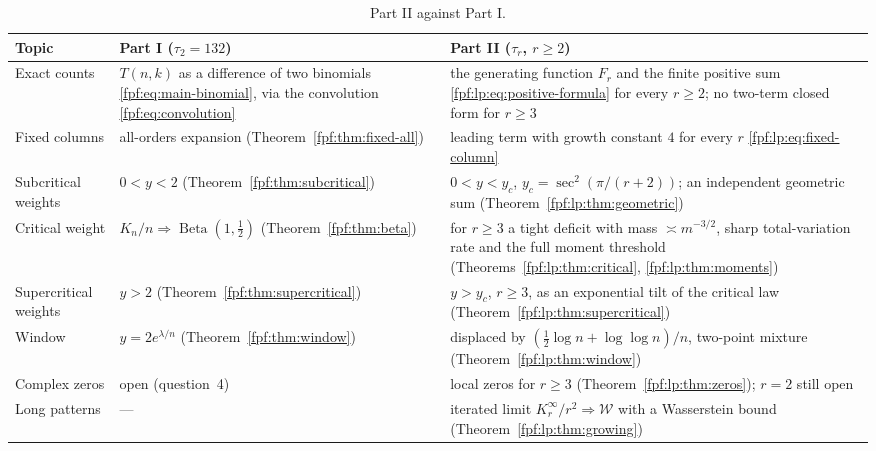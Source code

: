 \documentclass[11pt]{article}
\numberwithin{equation}{section}
\theoremstyle{definition}
\newcommand{\Beta}{\operatorname{Beta}}
\begin{document}
\begin{table}[htbp]
\centering\small
\renewcommand{\arraystretch}{1.15}
\begin{tabular}{@{}>{\raggedright\arraybackslash}p{}>{\raggedright\arraybackslash}p{}>{\raggedright\arraybackslash}p{}@{}}
\toprule
Topic & Part I ($\tau_2=132$) & Part II ($\tau_r$, $r\ge2$)\\
\midrule
Exact counts &
$T(n,k)$ as a difference of two binomials
\eqref{fpf:eq:main-binomial}, via the convolution
\eqref{fpf:eq:convolution} &
the generating function $F_r$ and the finite positive sum
\eqref{fpf:lp:eq:positive-formula} for every $r\ge2$; no two-term closed
form for $r\ge3$\\
Fixed columns &
all-orders expansion (Theorem~\ref{fpf:thm:fixed-all}) &
leading term with growth constant $4$ for every $r$
\eqref{fpf:lp:eq:fixed-column}\\
Subcritical weights &
$0<y<2$ (Theorem~\ref{fpf:thm:subcritical}) &
$0<y<y_c$, $y_c=\sec^2(\pi/(r+2))$; an independent geometric sum
(Theorem~\ref{fpf:lp:thm:geometric})\\
Critical weight &
$K_n/n\Rightarrow\Beta(1,\frac12)$ (Theorem~\ref{fpf:thm:beta}) &
for $r\ge3$ a tight deficit with mass $\asymp m^{-3/2}$, sharp
total-variation rate and the full moment threshold
(Theorems~\ref{fpf:lp:thm:critical}, \ref{fpf:lp:thm:moments})\\
Supercritical weights &
$y>2$ (Theorem~\ref{fpf:thm:supercritical}) &
$y>y_c$, $r\ge3$, as an exponential tilt of the critical law
(Theorem~\ref{fpf:lp:thm:supercritical})\\
Window &
$y=2e^{\lambda/n}$ (Theorem~\ref{fpf:thm:window}) &
displaced by $(\frac12\log n+\log\log n)/n$, two-point mixture
(Theorem~\ref{fpf:lp:thm:window})\\
Complex zeros &
open (question~4) &
local zeros for $r\ge3$ (Theorem~\ref{fpf:lp:thm:zeros}); $r=2$ still
open\\
Long patterns &
--- &
iterated limit $K_r^\infty/r^2\Rightarrow\mathcal W$ with a Wasserstein bound
(Theorem~\ref{fpf:lp:thm:growing})\\
\bottomrule
\end{tabular}
\caption{Part II against Part I.}
\label{fpf:lp:tab:claims}
\end{table}
\end{document}
